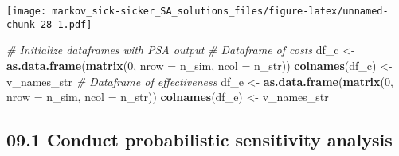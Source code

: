 \documentclass[
]{article}
\newenvironment{Shaded}{\begin{snugshade}}{\end{snugshade}}
\newcommand{\CharTok}[1]{\textcolor[rgb]{0.31,0.60,0.02}{#1}}
\newcommand{\CommentTok}[1]{\textcolor[rgb]{0.56,0.35,0.01}{\textit{#1}}}
\newcommand{\ControlFlowTok}[1]{\textcolor[rgb]{0.13,0.29,0.53}{\textbf{#1}}}
\newcommand{\DataTypeTok}[1]{\textcolor[rgb]{0.13,0.29,0.53}{#1}}
\newcommand{\DecValTok}[1]{\textcolor[rgb]{0.00,0.00,0.81}{#1}}
\newcommand{\KeywordTok}[1]{\textcolor[rgb]{0.13,0.29,0.53}{\textbf{#1}}}
\newcommand{\NormalTok}[1]{#1}
\newcommand{\OperatorTok}[1]{\textcolor[rgb]{0.81,0.36,0.00}{\textbf{#1}}}
\newcommand{\StringTok}[1]{\textcolor[rgb]{0.31,0.60,0.02}{#1}}
\begin{document}
\texttt{[image: markov\_sick-sicker\_SA\_solutions\_files/figure-latex/unnamed-chunk-28-1.pdf]}

\begin{Shaded}
\begin{Highlighting}[]
\CommentTok{# Initialize dataframes with PSA output }
\CommentTok{# Dataframe of costs}
\NormalTok{df_c <-}\StringTok{ }\KeywordTok{as.data.frame}\NormalTok{(}\KeywordTok{matrix}\NormalTok{(}\DecValTok{0}\NormalTok{, }
                      \DataTypeTok{nrow =}\NormalTok{ n_sim,}
                      \DataTypeTok{ncol =}\NormalTok{ n_str))}
\KeywordTok{colnames}\NormalTok{(df_c) <-}\StringTok{ }\NormalTok{v_names_str}
\CommentTok{# Dataframe of effectiveness}
\NormalTok{df_e <-}\StringTok{ }\KeywordTok{as.data.frame}\NormalTok{(}\KeywordTok{matrix}\NormalTok{(}\DecValTok{0}\NormalTok{, }
                      \DataTypeTok{nrow =}\NormalTok{ n_sim,}
                      \DataTypeTok{ncol =}\NormalTok{ n_str))}
\KeywordTok{colnames}\NormalTok{(df_e) <-}\StringTok{ }\NormalTok{v_names_str}
\end{Highlighting}
\end{Shaded}

\hypertarget{conduct-probabilistic-sensitivity-analysis}{%
\subsection{09.1 Conduct probabilistic sensitivity
analysis}\label{conduct-probabilistic-sensitivity-analysis}}

\begin{Shaded}
\end{Shaded}
\end{document}
